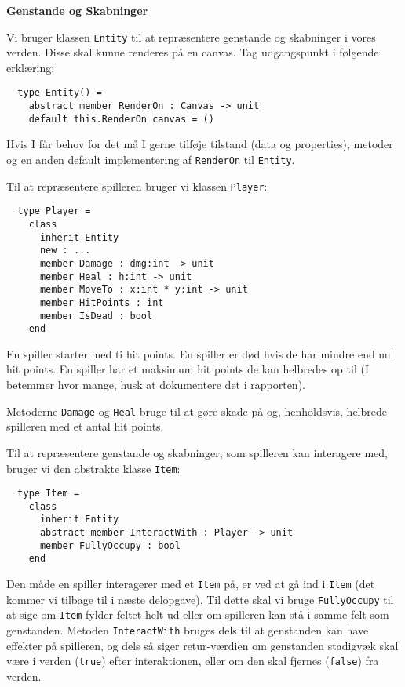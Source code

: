 \textbf{Genstande og Skabninger}

Vi bruger klassen \lstinline{Entity} til at repræsentere genstande og skabninger
i vores verden. Disse skal kunne renderes på en canvas. Tag udgangspunkt i
følgende erklæring:

\begin{lstlisting}
  type Entity() =
    abstract member RenderOn : Canvas -> unit
    default this.RenderOn canvas = ()
\end{lstlisting}

Hvis I får behov for det må I gerne tilføje tilstand (data og
properties), metoder og en anden default implementering af
\lstinline{RenderOn} til \lstinline{Entity}.

Til at repræsentere spilleren bruger vi klassen \lstinline{Player}:

\begin{lstlisting}
  type Player =
    class
      inherit Entity
      new : ...
      member Damage : dmg:int -> unit
      member Heal : h:int -> unit
      member MoveTo : x:int * y:int -> unit
      member HitPoints : int
      member IsDead : bool
    end
\end{lstlisting}

En spiller starter med ti hit points. En
spiller er død hvis de har mindre end nul hit points. En spiller
har et maksimum hit points de kan helbredes op til (I betemmer
hvor mange, husk at dokumentere det i rapporten).

Metoderne \lstinline{Damage} og \lstinline{Heal} bruge til at gøre
skade på og, henholdsvis, helbrede spilleren med et antal hit points.

Til at repræsentere genstande og skabninger, som spilleren kan
interagere med, bruger vi den abstrakte klasse \lstinline{Item}:

\begin{lstlisting}
  type Item =
    class
      inherit Entity
      abstract member InteractWith : Player -> unit
      member FullyOccupy : bool
    end
\end{lstlisting}

Den måde en spiller interagerer med et \lstinline{Item} på, er ved at
gå ind i \lstinline{Item} (det kommer vi tilbage til i næste
delopgave). Til dette skal vi bruge \lstinline{FullyOccupy} til at
sige om \lstinline{Item} fylder feltet helt ud eller om spilleren kan
stå i samme felt som genstanden. Metoden \lstinline{InteractWith}
bruges dels til at genstanden kan have effekter på spilleren, og dels
så siger retur-værdien om genstanden stadigvæk skal være i verden
(\lstinline{true}) efter interaktionen, eller om den skal fjernes
(\lstinline{false}) fra verden.

